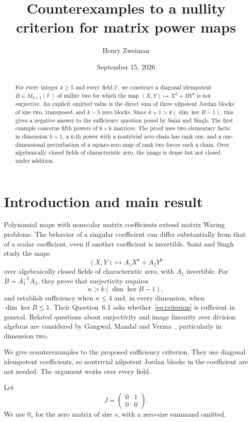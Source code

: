 \documentclass[11pt]{article}
\title{Counterexamples to a nullity criterion for matrix power maps}
\author{Henry Zweiman}
\date{September 15, 2026}
\theoremstyle{remark}\newtheorem{remark}[theorem]{Remark}
\newcommand{\F}{\mathbb F}
\begin{document}
\maketitle
\begin{abstract}
For every integer $k\ge5$ and every field $\F$, we construct a diagonal idempotent $B\in M_{k+1}(\F)$ of nullity two for which the map $(X,Y)\mapsto X^k+BY^k$ is not surjective. An explicit omitted value is the direct sum of three nilpotent Jordan blocks of size two, transposed, and $k-5$ zero blocks. Since $k+1>k(\dim\ker B-1)$, this gives a negative answer to the sufficiency question posed by Saini and Singh. The first example concerns fifth powers of $6\times6$ matrices. The proof uses two elementary facts: in dimension $k+1$, a $k$-th power with a nontrivial zero chain has rank one, and a one-dimensional perturbation of a square-zero map of rank two forces such a chain. Over algebraically closed fields of characteristic zero, the image is dense but not closed under addition.
\end{abstract}

\section{Introduction and main result}
Polynomial maps with nonscalar matrix coefficients extend matrix Waring problems. The behavior of a singular coefficient can differ substantially from that of a scalar coefficient, even if another coefficient is invertible. Saini and Singh~\cite{SS} study the maps
\[
 (X,Y)\longmapsto A_1X^k+A_2Y^k
\]
over algebraically closed fields of characteristic zero, with $A_1$ invertible. For $B=A_1^{-1}A_2$, they prove that surjectivity requires
\begin{equation}\label{eq:criterion}
 n>k(\dim\ker B-1),
\end{equation}
and establish sufficiency when $n\le4$ and, in every dimension, when $\dim\ker B\le1$. Their Question~6.1 asks whether~\eqref{eq:criterion} is sufficient in general. Related questions about surjectivity and image linearity over division algebras are considered by Gangwal, Mandal and Verma~\cite{GMV}, particularly in dimension two.

We give counterexamples to the proposed sufficiency criterion. They use diagonal idempotent coefficients, so nontrivial nilpotent Jordan blocks in the coefficient are not needed. The argument works over every field.

Let
\[
 J=\begin{pmatrix}0&1\\0&0\end{pmatrix}.
\]
We use $0_s$ for the zero matrix of size $s$, with a zero-size summand omitted.
\end{document}
